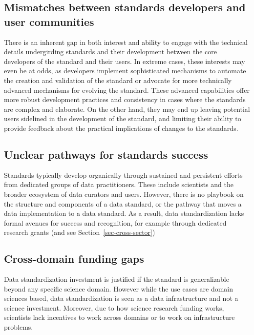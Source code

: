 \documentclass[
  letterpaper,
  DIV=11,
  numbers=noendperiod]{scrartcl}
\begin{document}
\subsection{Mismatches between standards developers and user
communities}\label{mismatches-between-standards-developers-and-user-communities}

There is an inherent gap in both interest and ability to engage with the
technical details undergirding standards and their development between
the core developers of the standard and their users. In extreme cases,
these interests may even be at odds, as developers implement
sophisticated mechanisms to automate the creation and validation of the
standard or advocate for more technically advanced mechanisms for
evolving the standard. These advanced capabilities offer more robust
development practices and consistency in cases where the standards are
complex and elaborate. On the other hand, they may end up leaving
potential users sidelined in the development of the standard, and
limiting their ability to provide feedback about the practical
implications of changes to the standards.

\subsection{Unclear pathways for standards
success}\label{unclear-pathways-for-standards-success}

Standards typically develop organically through sustained and persistent
efforts from dedicated groups of data practitioners. These include
scientists and the broader ecosystem of data curators and users.
However, there is no playbook on the structure and components of a data
standard, or the pathway that moves a data implementation to a data
standard. As a result, data standardization lacks formal avenues for
success and recognition, for example through dedicated research grants
(and see Section~\ref{sec-cross-sector})

\subsection{Cross-domain funding gaps}\label{cross-domain-funding-gaps}

Data standardization investment is justified if the standard is
generalizable beyond any specific science domain. However while the use
cases are domain sciences based, data standardization is seen as a data
infrastructure and not a science investment. Moreover, due to how
science research funding works, scientists lack incentives to work
across domains or to work on infrastructure problems.
\end{document}
